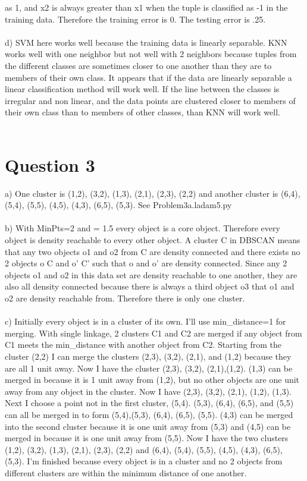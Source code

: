 \documentclass{article}
\begin{document}
 as 1, and x2 is always greater than x1 when the tuple is classified as -1 in the training data. Therefore the training error is 0.  The testing error
is .25.\\\\
d)  SVM here works well because the training data is linearly separable.  KNN works well with one neighbor but not well with 2 neighbors because tuples from
the different classes are sometimes closer to one another than they are to members of their own class.  It appears that if the data are linearly separable
a linear classification method will work well.  If the line between the classes is irregular and non linear, and the data points are clustered
closer to members of their own class than to members of other classes, than KNN will work well.\\\\


\section{Question 3}
a) One cluster is {(1,2), (3,2), (1,3), (2,1), (2,3), (2,2)} and another cluster is {(6,4), (5,4), (5,5), (4,5), (4,3), (6,5), (5,3)}.  See 
Problem3a.ladam5.py\\\\
b) With MinPts=2 and \epsilon = 1.5 every object is a core object.  Therefore every object is density reachable to every other object.  A cluster C in 
DBSCAN means that any two objects o1 and o2 from C are density connected and there exists no 2 objects o \epsilon C and o' \epsilon C' such that 
o and o' are density connected.  Since any 2 objects o1 and o2 in this data set are density reachable to one another, they are also all density connected 
because there is always a third object o3 that o1 and o2 are density reachable from.  Therefore there is only one cluster.\\\\
c) Initially every object is in a cluster of its own.  I'll use min_distance=1 for merging.  With single linkage, 2 clusters C1 and C2 are merged
 if any object from C1 meets the min_distance with another object from C2.  Starting from the cluster (2,2) I can merge the clusters (2,3), (3,2), 
 (2,1), and (1,2) because they are all 1 unit away.  Now I have the cluster {(2,3), (3,2), (2,1),(1,2)}.  (1,3) can be merged in because it is 1 unit 
 away from (1,2), but no other objects are one unit away from any object in the cluster.  Now I have {(2,3), (3,2), (2,1), (1,2), (1,3)}.  Next I 
 choose a point not in the first cluster, (5,4).  (5,3), (6,4), (6,5), and (5,5) can all be merged in to form {(5,4),(5,3), (6,4), (6,5), (5,5)}. (4,3) 
 can be merged into the second cluster because it is one unit away from (5,3) and (4,5) can be merged in because it is one unit away from (5,5). 
 Now I have the two clusters {(1,2), (3,2), (1,3), (2,1), (2,3), (2,2)} and {(6,4), (5,4), (5,5), (4,5), (4,3), (6,5), (5,3)}.  I'm finished because 
 every object is in a cluster and no 2 objects from different clusters are within the minimum distance of one another.
\end{document}
